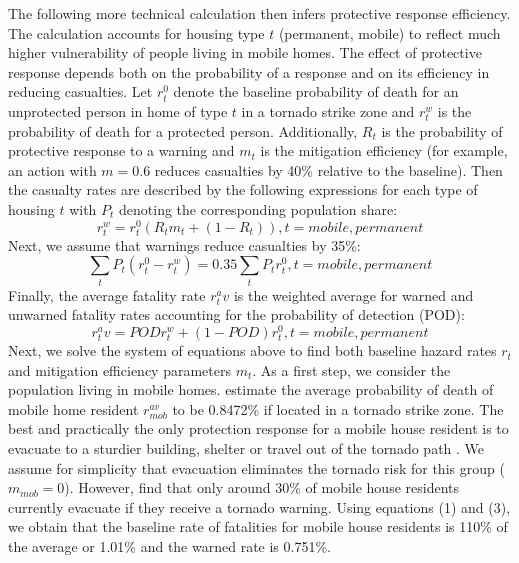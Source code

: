 \documentclass{ametsocV6.1}
\begin{document}
The following more technical calculation then infers protective response efficiency. The calculation accounts for housing type $t$ (permanent, mobile) to reflect much higher vulnerability of people living in mobile homes. The effect of protective response depends both on the probability of a response and on its efficiency in reducing casualties. Let $r_t^0$ denote the baseline probability of death for an unprotected person in home of type $t$ in a tornado strike zone and $r_t^w$ is the probability of death for a protected person. Additionally,  $R_t$ is the probability of protective response to a warning and $m_t$ is the mitigation efficiency (for example, an action with $m=0.6$ reduces casualties by 40\% relative to the baseline). Then the casualty rates are described by the following expressions for each type of housing $t$ with $P_t$ denoting the corresponding population share:
\begin{equation}
r^w_t=r^0_t(R_tm_t+(1-R_t)),t=mobile,permanent 
\end{equation}
Next, we assume that warnings reduce casualties by 35\%:
\begin{equation}
\sum_t P_t (r^0_t-r^w_t)=0.35 \sum_t P_t r^0_t,t=mobile,permanent 
\end{equation}
Finally, the average fatality rate $r_t^av$ is the weighted average for warned and unwarned fatality rates accounting for the probability of detection (POD):
\begin{equation}
r_t^av=PODr_t^w+(1-POD)r_t^0,t=mobile,permanent     
\end{equation}
Next, we solve the system of equations above to find both baseline hazard rates $r_t$ and mitigation efficiency parameters $m_t$. As a first step, we consider the population living in mobile homes. \citet{simmons_economic_2013} estimate the average probability of death of mobile home resident $r_{mob}^{av}$ to be 0.8472\% if located in a tornado strike zone. The best and practically the only protection response for a mobile house resident is to evacuate to a sturdier building, shelter or travel out of the tornado path \citep{schmidlin_tornado_2009}. We assume for simplicity that evacuation eliminates the tornado risk for this group ($m_{mob}=0$). However, \citet{schmidlin_tornado_2009} find that only around 30\% of mobile house residents currently evacuate if they receive a tornado warning. Using equations (1) and (3), we obtain that the baseline rate of fatalities for mobile house residents is 110\% of the average or 1.01\% and the warned rate is 0.751\%.
\end{document}
